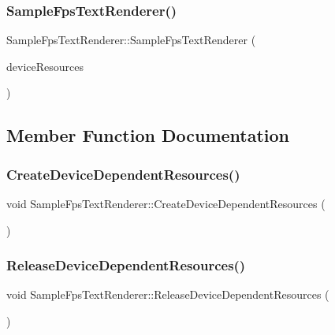 \subsubsection{\texorpdfstring{Sample\+Fps\+Text\+Renderer()}{SampleFpsTextRenderer()}}
{\footnotesize\ttfamily Sample\+Fps\+Text\+Renderer\+::\+Sample\+Fps\+Text\+Renderer (\begin{DoxyParamCaption}\item[{const std\+::shared\+\_\+ptr$<$ \hyperlink{class_d_x_1_1_device_resources}{D\+X\+::\+Device\+Resources} $>$ \&}]{device\+Resources }\end{DoxyParamCaption})}



\subsection{Member Function Documentation}
\mbox{\label{class_cube_1_1_sample_fps_text_renderer_a86bbaf2cdd8f72142c3b9461ca1b573a}} 
\subsubsection{\texorpdfstring{Create\+Device\+Dependent\+Resources()}{CreateDeviceDependentResources()}}
{\footnotesize\ttfamily void Sample\+Fps\+Text\+Renderer\+::\+Create\+Device\+Dependent\+Resources (\begin{DoxyParamCaption}{ }\end{DoxyParamCaption})}

\mbox{\label{class_cube_1_1_sample_fps_text_renderer_a2b8c34eeaf99be9555f432a1ffd9f13f}} 
\subsubsection{\texorpdfstring{Release\+Device\+Dependent\+Resources()}{ReleaseDeviceDependentResources()}}
{\footnotesize\ttfamily void Sample\+Fps\+Text\+Renderer\+::\+Release\+Device\+Dependent\+Resources (\begin{DoxyParamCaption}{ }\end{DoxyParamCaption})}

